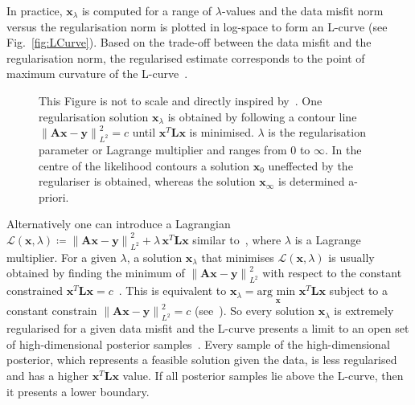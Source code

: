 In practice, $\bm{x}_{\lambda}$ is computed for a range of $\lambda$-values and the data misfit norm versus the regularisation norm is plotted in log-space to form an L-curve (see Fig.~\ref{fig:LCurve}).
Based on the trade-off between the data misfit and the regularisation norm, the regularised estimate corresponds to the point of maximum curvature of the L-curve~\cite{hansen1993use}.

\begin{figure}[ht!]
	\centering
	
	\caption[]{This Figure is not to scale and directly inspired by~\cite{ColinPhD}. One regularisation solution $\bm{x}_{\lambda}$ is obtained by following a contour line $\left\lVert \bm{A} \bm{x} -\bm{y} \right\rVert^2_{L^2}= c$ until $\bm{x}^T \bm{L} \bm{x}$ is minimised. $\lambda$ is the regularisation parameter or Lagrange multiplier and ranges from $0$ to $\infty$. In the centre of the likelihood contours a solution $\bm{x}_{0}$ uneffected by the regulariser is obtained, whereas the solution $\bm{x}_{\infty}$ is determined a-priori.}
	\label{fig:Langrangian}
\end{figure}
Alternatively one can introduce a Lagrangian $\mathcal{L}(\bm{x},\lambda)\coloneqq \left\lVert \bm{A} \bm{x} -\bm{y} \right\rVert^2_{L^2} + \lambda \, \bm{x}^T\bm{L} \bm{x}$ similar to~\cite{LiLagrange}, where $\lambda$ is a Lagrange multiplier.
For a given $\lambda$, a solution $\bm{x}_{\lambda} $ that minimises $\mathcal{L}(\bm{x},\lambda)$ is usually obtained by finding the minimum of $\left\lVert \bm{A} \bm{x} - \bm{y} \right\rVert^2_{L^2}$ with respect to the constant constrained $\bm{x}^T \bm{L} \bm{x} = c$~\cite[Fig.~2.13]{SANTOSH202265}.
This is equivalent to $\bm{x}_{\lambda}  = \underset{\bm{x}}{\text{arg min }}\bm{x}^T \bm{L} \bm{x}$ subject to a constant constrain $\left\lVert  \bm{A} \bm{x} -\bm{y} \right\rVert^2_{L^2}= c$ (see~\cite[fn.~6]{fox2016fast}). 
So every solution $\bm{x}_{\lambda}$ is extremely regularised for a given data misfit and the L-curve presents a limit to an open set of high-dimensional posterior samples~\cite{VowelsMultiD}.
Every sample of the high-dimensional posterior, which represents a feasible solution given the data, is less regularised and has a higher $ \bm{x}^T \bm{L} \bm{x}$ value.
If all posterior samples lie above the L-curve, then it presents a lower boundary.

